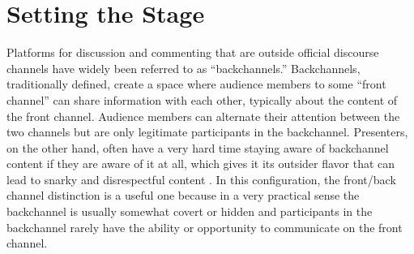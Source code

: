 %  



% 

%  









\section {Setting the Stage}

Platforms for discussion and commenting that are outside official discourse channels have widely been referred to as ``backchannels.''  Backchannels, traditionally defined, create a space where audience members to some ``front channel'' can share information with each other, typically about the content of the front channel. Audience members can alternate their attention between the two channels but are only legitimate participants in the backchannel. Presenters, on the other hand, often have a very hard time staying aware of backchannel content if they are aware of it at all, which gives it its outsider flavor that can lead to snarky and disrespectful content \citep{boyd:Yo36SNyj}. In this configuration, the front/back channel distinction is a useful one because in a very practical sense the backchannel is usually somewhat covert or hidden and participants in the backchannel rarely have the ability or opportunity to communicate on the front channel.

